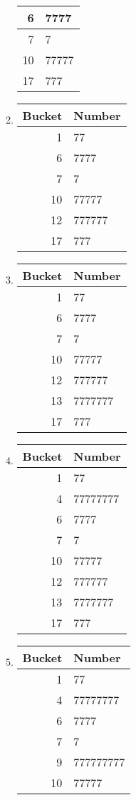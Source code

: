 \documentclass[12pt]{article}
\begin{document}
\begin{enumerate}[a]
\begin{multicols}{2}
\begin{enumerate}[1]
\begin{tabular}{r|l}
			6 & 7777\\\hline
			7 & 7\\\hline
			10 & 77777\\\hline
			17 & 777
		\end{tabular}
		\item
		\begin{tabular}{r|l}
			Bucket & Number\\\hline\hline
			1 & 77\\\hline
			6 & 7777\\\hline
			7 & 7\\\hline
			10 & 77777\\\hline
			12 & 777777\\\hline
			17 & 777
		\end{tabular}
		\item
		\begin{tabular}{r|l}
			Bucket & Number\\\hline\hline
			1 & 77\\\hline
			6 & 7777\\\hline
			7 & 7\\\hline
			10 & 77777\\\hline
			12 & 777777\\\hline
			13 & 7777777\\\hline
			17 & 777
		\end{tabular}
		\item
		\begin{tabular}{r|l}
			Bucket & Number\\\hline\hline
			1 & 77\\\hline
			4 & 77777777\\\hline
			6 & 7777\\\hline
			7 & 7\\\hline
			10 & 77777\\\hline
			12 & 777777\\\hline
			13 & 7777777\\\hline
			17 & 777
		\end{tabular}
		\item
		\begin{tabular}{r|l}
			Bucket & Number\\\hline\hline
			1 & 77\\\hline
			4 & 77777777\\\hline
			6 & 7777\\\hline
			7 & 7\\\hline
			9 & 777777777\\\hline
			10 & 77777\\\hline

\end{tabular}
\end{enumerate}
\end{multicols}
\end{enumerate}
\end{document}
